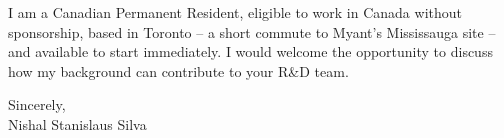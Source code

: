 \documentclass[11pt]{article}
\begin{document}
\vspace{0.5em}
\noindent I am a Canadian Permanent Resident, eligible to work in Canada without sponsorship, based in Toronto -- a short commute to Myant's Mississauga site -- and available to start immediately. I would welcome the opportunity to discuss how my background can contribute to your R\&D team.

\vspace{1em}
\noindent Sincerely, \\
Nishal Stanislaus Silva
\end{document}
